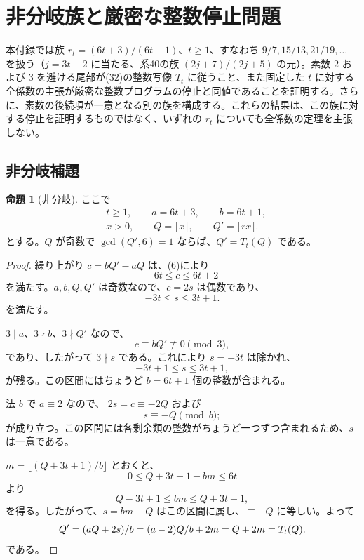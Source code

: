 \documentclass[11pt,reqno]{amsart}
\theoremstyle{definition}
\newtheorem{proposition}[theorem]{命題}
\theoremstyle{definition}
\theoremstyle{remark}
\begin{document}
\section{非分岐族と厳密な整数停止問題}\label{app:C}

本付録では族 \(r_t=(6t+3)/(6t+1)\)、\(t\ge1\)、すなわち \(9/7,15/13,21/19,\ldots\) を扱う（\(j=3t-2\) に当たる、系40の族 \((2j+7)/(2j+5)\) の元）。素数 \(2\) および \(3\) を避ける尾部が(32)の整数写像 \(T_t\) に従うこと、また固定した \(t\) に対する全係数の主張が厳密な整数プログラムの停止と同値であることを証明する。さらに、素数の後続項が一意となる別の族を構成する。これらの結果は、この族に対する停止を証明するものではなく、いずれの \(r_t\) についても全係数の定理を主張しない。

\subsection{非分岐補題}\label{sec:C.1}

\begin{samepage}
\begin{proposition}[非分岐]\leavevmode\label{thm:55}
ここで
\[
\begin{aligned}
&t\ge1,\qquad a=6t+3,\qquad b=6t+1,\\
&x>0,\qquad Q=\lfloor x\rfloor,\qquad Q'=\lfloor rx\rfloor.
\end{aligned}
\]
とする。\(Q\) が奇数で \(\gcd(Q',6)=1\) ならば、\(Q'=T_t(Q)\) である。
\label{thm-end:55}
\end{proposition}
\end{samepage}

\begin{proof}\leavevmode\label{proof:55}
繰り上がり \(c=bQ'-aQ\) は、(6)により
\[
-6t\le c\le6t+2
\]
を満たす。\(a,b,Q,Q'\) は奇数なので、\(c=2s\) は偶数であり、
\[
-3t\le s\le3t+1.
\]
を満たす。

\(3\mid a\)、\(3\nmid b\)、\(3\nmid Q'\) なので、
\[
c\equiv bQ'\not\equiv0\pmod3,
\]
であり、したがって \(3\nmid s\) である。これにより \(s=-3t\) は除かれ、
\[
-3t+1\le s\le3t+1,
\]
が残る。この区間にはちょうど \(b=6t+1\) 個の整数が含まれる。

法 \(b\) で \(a\equiv2\) なので、
\(2s=c\equiv-2Q\) および
\[
s\equiv-Q\pmod b;
\]
が成り立つ。この区間には各剰余類の整数がちょうど一つずつ含まれるため、\(s\) は一意である。

\(m=\lfloor(Q+3t+1)/b\rfloor\) とおくと、
\[
0\le Q+3t+1-bm\le6t
\]
より
\[
Q-3t+1\le bm\le Q+3t+1,
\]
を得る。したがって、\(s=bm-Q\) はこの区間に属し、\(\equiv-Q\) に等しい。よって
\[
Q'=(aQ+2s)/b=(a-2)Q/b+2m=Q+2m=T_t(Q).\qedhere
\]
である。
\end{proof}
\end{document}
